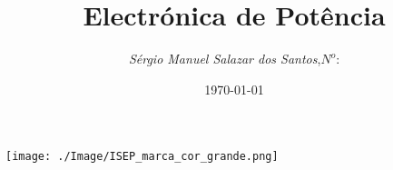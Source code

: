 \begin{titlepage}
\begin{minipage}{0.95\linewidth}
\centering
\texttt{[image: ./Image/ISEP\_marca\_cor\_grande.png]}
\label{Capa}
\title{Electr\'{o}nica de Pot\^{e}ncia}
\author{\emph{S\'{e}rgio Manuel Salazar dos Santos},\;$N^o$:}
\date{\today}
\maketitle
\end{minipage}
\end{titlepage}
